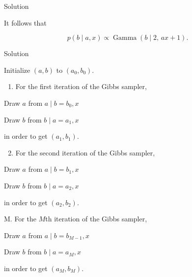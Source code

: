 \documentclass[
  ignorenonframetext,
]{beamer}
\providecommand{\tightlist}{%
  \setlength{\itemsep}{0pt}\setlength{\parskip}{0pt}}
\DeclareMathOperator*{\Ga}{Gamma}
\begin{document}
\begin{frame}{Solution}
\protect\hypertarget{solution-2}{}

It follows that

\[p(b \mid a,x) {\propto} \Ga(b\mid 2,\, a x + 1).\]

\end{frame}

\begin{frame}{Solution}
\protect\hypertarget{solution-3}{}

Initialize \((a,b)\) to \((a_0, b_0).\)

\begin{enumerate}
\tightlist
\item
  For the first iteration of the Gibbs sampler,
\end{enumerate}

Draw \(a\) from \(a \mid b=b_0,x\)

Draw \(b\) from \(b \mid a=a_1,x\)

in order to get \((a_1,b_1).\)

\begin{enumerate}
\setcounter{enumi}{1}
\tightlist
\item
  For the second iteration of the Gibbs sampler,
\end{enumerate}

Draw \(a\) from \(a \mid b=b_1,x\)

Draw \(b\) from \(b \mid a=a_2,x\)

in order to get \((a_2,b_2).\)

M. For the \(M\)th iteration of the Gibbs sampler,

Draw \(a\) from \(a \mid b=b_{M-1},x\)

Draw \(b\) from \(b \mid a=a_{M},x\)

in order to get \((a_M,b_M).\)

\end{frame}
\end{document}
